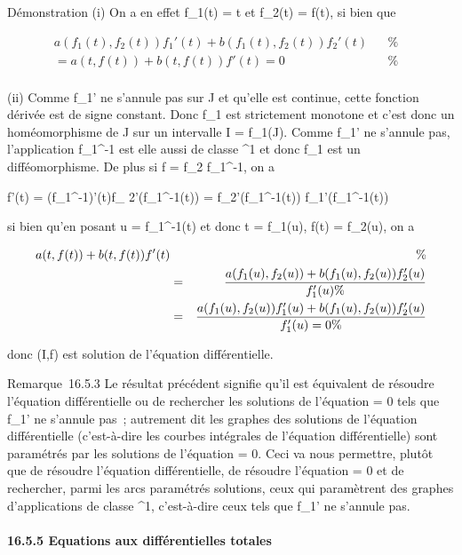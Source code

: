 Démonstration (i) On a en effet f_1(t) = t et f_2(t) =
f(t), si bien que

\begin{align*}
a(f_1(t),f_2(t))f_1'(t) +
b(f_1(t),f_2(t))f_2'(t)& & \%&
\\ = a(t,f(t)) + b(t,f(t))f'(t) = 0& &
\%& \\ \end{align*}

(ii) Comme f_1' ne s'annule pas sur J et qu'elle est continue,
cette fonction dérivée est de signe constant. Donc f_1 est
strictement monotone et c'est donc un homéomorphisme de J sur un
intervalle I = f_1(J). Comme f_1' ne s'annule pas,
l'application f_1^-1 est elle aussi de classe
^1 et donc f_1 est un difféomorphisme. De plus si f
= f_2 \cdot f_1^-1, on a

f'(t) = \left
(f_1^-1\right )'(t)f_
2'(f_1^-1(t)) =
f_2'(f_1^-1(t)) \over
f_1'(f_1^-1(t))

si bien qu'en posant u = f_1^-1(t) et donc t =
f_1(u), f(t) = f_2(u), on a

\begin{align*} a(t,f(t)) + b(t,f(t))f'(t)&& \%&
\\ & =&
a(f_1(u),f_2(u)) +
b(f_1(u),f_2(u)) f_2'(u)
\over f_1'(u) \%&
\\ & =&
a(f_1(u),f_2(u))f_1'(u) +
b(f_1(u),f_2(u))f_2'(u) \over
f_1'(u) = 0\%& \\
\end{align*}

donc (I,f) est solution de l'équation différentielle.

Remarque~16.5.3 Le résultat précédent signifie qu'il est équivalent de
résoudre l'équation différentielle ou de rechercher les solutions de
l'équation \omega = 0 tels que f_1' ne s'annule pas~; autrement dit
les graphes des solutions de l'équation différentielle (c'est-à-dire les
courbes intégrales de l'équation différentielle) sont paramétrés par les
solutions de l'équation \omega = 0. Ceci va nous permettre, plutôt que de
résoudre l'équation différentielle, de résoudre l'équation \omega = 0 et de
rechercher, parmi les arcs paramétrés solutions, ceux qui paramètrent
des graphes d'applications de classe ^1, c'est-à-dire ceux
tels que f_1' ne s'annule pas.

\paragraph{16.5.5 Equations aux différentielles totales}

